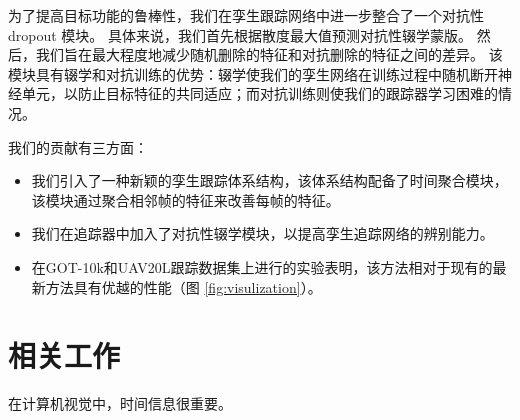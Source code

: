 为了提高目标功能的鲁棒性，我们在孪生跟踪网络中进一步整合了一个对抗性 dropout \cite{park2018adversarial} 模块。
具体来说，我们首先根据散度最大值预测对抗性辍学蒙版。
然后，我们旨在最大程度地减少随机删除的特征和对抗删除的特征之间的差异。
该模块具有辍学和对抗训练的优势：辍学使我们的孪生网络在训练过程中随机断开神经单元，以防止目标特征的共同适应；而对抗训练则使我们的跟踪器学习困难的情况。

我们的贡献有三方面：
\begin{itemize}
\item 我们引入了一种新颖的孪生跟踪体系结构，该体系结构配备了时间聚合模块，该模块通过聚合相邻帧的特征来改善每帧的特征。
\item 我们在追踪器中加入了对抗性辍学模块，以提高孪生追踪网络的辨别能力。
\item 在GOT-10k和UAV20L跟踪数据集上进行的实验表明，该方法相对于现有的最新方法具有优越的性能（图 \ref{fig:visulization}）。
\end{itemize}

\section{相关工作}
在计算机视觉中，时间信息很重要。

